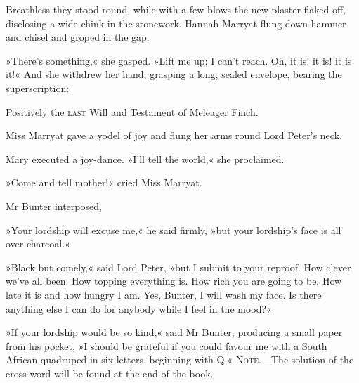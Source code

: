 Breathless they stood round, while with a few blows the new plaster flaked off, disclosing a wide chink in the stonework. Hannah Marryat flung down hammer and chisel and groped in the gap.

»There's something,« she gasped. »Lift me up; I can't reach. Oh, it is! it is! it is it!« And she withdrew her hand, grasping a long, sealed envelope, bearing the superscription:

Positively the \textsc{last} Will and Testament of Meleager Finch.

Miss Marryat gave a yodel of joy and flung her arms round Lord Peter's neck.

Mary executed a joy-dance. »I'll tell the world,« she proclaimed.

»Come and tell mother!« cried Miss Marryat.

Mr Bunter interposed,

»Your lordship will excuse me,« he said firmly, »but your lordship's face is all over charcoal.«

»Black but comely,« said Lord Peter, »but I submit to your reproof. How clever we've all been. How topping everything is. How rich you are going to be. How late it is and how hungry I am. Yes, Bunter, I will wash my face. Is there anything else I can do for anybody while I feel in the mood?«

»If your lordship would be so kind,« said Mr Bunter, producing a small paper from his pocket, »I should be grateful if you could favour me with a South African quadruped in six letters, beginning with Q.«
\vfill
\textsc{Note}.—The solution of the cross-word will be found at the end of the book.